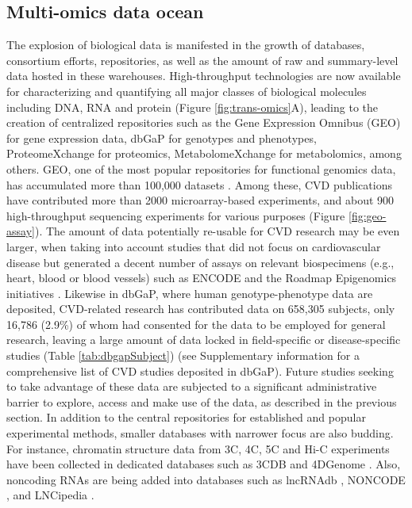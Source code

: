 \documentclass[letter]{bib}
\begin{document}
	\subsection*{Multi-omics data ocean}
    The explosion of biological data is manifested in the growth of databases, consortium efforts, repositories, as well as the amount of raw and summary-level data hosted in these warehouses. High-throughput technologies are now available for characterizing and quantifying all major classes of biological molecules including DNA, RNA and protein (Figure \ref{fig:trans-omics}A), leading to the creation of centralized repositories such as the Gene Expression Omnibus (GEO) \citep{Barrett:2013:NCBI} for gene expression data, dbGaP \citep{Tryka:2014:dbGaP} for genotypes and phenotypes, ProteomeXchange \citep{Vizcaino:2014:ProteomeXchange,Deutsch:2017:ProteomeXchange} for proteomics, MetabolomeXchange for metabolomics, among others.  GEO, one of the most popular repositories for functional genomics data, has accumulated more than 100,000 datasets \citep{Zhu:2008:GEOmetadb}. Among these, CVD publications have contributed more than 2000 microarray-based experiments, and about 900 high-throughput sequencing experiments for various purposes (Figure \ref{fig:geo-assay}). The amount of data potentially re-usable for CVD research may be even larger, when taking into account studies that did not focus on cardiovascular disease but generated a decent number of assays on relevant biospecimens (e.g., heart, blood or blood vessels) such as ENCODE \citep{ENCODE:2012:integrated} and the Roadmap Epigenomics initiatives \citep{Roadmap:2015:Integrative}.
	Likewise in dbGaP, where human genotype-phenotype data are deposited, CVD-related research has contributed data on 658,305 subjects, only 16,786 (2.9\%) of whom had consented for the data to be employed for general research, leaving a large amount of data locked in field-specific or disease-specific studies (Table \ref{tab:dbgapSubject}) (see Supplementary information for a comprehensive list of CVD studies deposited in dbGaP). Future studies seeking to take advantage of these data are subjected to a significant administrative barrier to explore, access and make use of the data, as described in the previous section.
	In addition to the central repositories for established and popular experimental methods, smaller databases with narrower focus are also budding. For instance, chromatin structure data from 3C, 4C, 5C and Hi-C experiments have been collected in dedicated databases such as 3CDB \citep{Yun:2016:3CDB} and 4DGenome \citep{Teng:2015:4DGenome}. Also, noncoding RNAs are being added into databases such as lncRNAdb \citep{Quek:2015:lncRNAdb}, NONCODE \citep{Fang:2018:NONCODEV5}, and LNCipedia \citep{Volders:2018:LNCipedia}.
	
\end{document}
